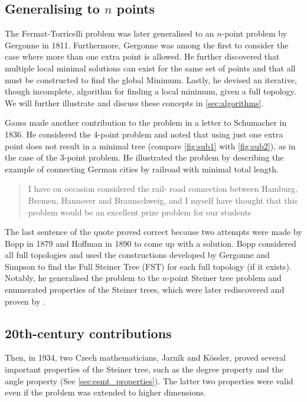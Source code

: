 \documentclass{l4proj}
\begin{document}
\subsection{Generalising to $n$ points}
\label{sec:gergonne}
The Fermat-Torricelli problem was later generalised to an $n$-point problem by Gergonne in 1811. Furthermore, Gergonne was among the first to consider the case where more than one extra point is allowed. He further discovered that multiple local minimal solutions can exist for the same set of points and that all must be constructed to find the global Minimum. Lastly, he devised an iterative, though incomplete, algorithm for finding a local minimum, given a full topology. We will further illustrate and discuss these concepts in \ref{sec:algorithms}.

Gauss made another contribution to the problem in a letter to Schumacher in 1836. He considered the 4-point problem and noted that using just one extra point does not result in a minimal tree (compare \ref{fig:sub1} with \ref{fig:sub2}), as in the case of the 3-point problem. He illustrated the problem by describing the example of connecting German cities by railroad with minimal total length.
\begin{quote}
    I have on occasion considered the rail- road connection between Hamburg, Bremen, Hannover and Braunschweig, and I myself have thought that this problem would be an excellent prize problem for our students
\end{quote}

The last sentence of the quote proved correct because two attempts were made by Bopp in 1879 and Hoffman in 1890 to come up with a solution. Bopp considered all full topologies and used the constructions developed by Gergonne and Simpson to find the Full Steiner Tree (FST) for each full topology (if it exists). Notably, he generalised the problem to the $n$-point Steiner tree problem and enumerated properties of the Steiner trees, which were later rediscovered and proven by \cite{Gilbert1968SteinerMT}.

\subsection{20th-century contributions}
Then, in 1934, two Czech mathematicians, Jarník and Kössler, proved several important properties of the Steiner tree, such as the degree property and the angle property (See \ref{sec:esmt_properties}). The latter two properties were valid even if the problem was extended to higher dimensions.
\end{document}
